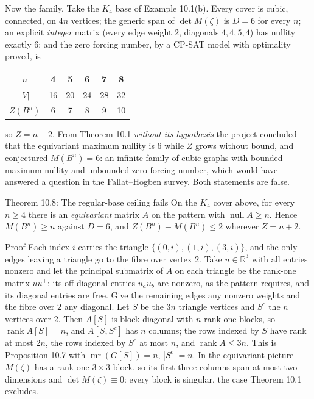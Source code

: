 \documentclass[11pt]{article}
\begin{document}
Now the family. Take the $K_4$ base of Example 10.1(b). Every cover is cubic, connected, on $4n$ vertices; the generic span of $\det M(\zeta)$ is $D=6$ for every $n$; an explicit \emph{integer} matrix (every edge weight $2$, diagonals $4,4,5,4$) has nullity exactly $6$; and the zero forcing number, by a CP-SAT model with optimality proved, is
\begin{center}
\begin{tabular}{c|ccccc}
$n$ & 4 & 5 & 6 & 7 & 8\\ \hline
$|V|$ & 16 & 20 & 24 & 28 & 32\\
$Z(B^n)$ & 6 & 7 & 8 & 9 & 10
\end{tabular}
\end{center}
so $Z=n+2$. From Theorem 10.1 \emph{without its hypothesis} the project concluded that the equivariant maximum nullity is $6$ while $Z$ grows without bound, and conjectured $M(B^n)=6$: an infinite family of cubic graphs with bounded maximum nullity and unbounded zero forcing number, which would have answered a question in the Fallat--Hogben survey. Both statements are false.

\begin{thmbox}{Theorem 10.8: The regular-base ceiling fails}
On the $K_4$ cover above, for every $n\ge4$ there is an \emph{equivariant} matrix $A$ on the pattern with $\operatorname{null}A\ge n$. Hence $M(B^n)\ge n$ against $D=6$, and $Z(B^n)-M(B^n)\le2$ wherever $Z=n+2$.
\end{thmbox}

\begin{defbox}{Proof}
Each index $i$ carries the triangle $\{(0,i),(1,i),(3,i)\}$, and the only edges leaving a triangle go to the fibre over vertex $2$. Take $u\in\mathbb R^3$ with all entries nonzero and let the principal submatrix of $A$ on each triangle be the rank-one matrix $uu^{\top}$: its off-diagonal entries $u_au_b$ are nonzero, as the pattern requires, and its diagonal entries are free. Give the remaining edges any nonzero weights and the fibre over $2$ any diagonal. Let $S$ be the $3n$ triangle vertices and $S^c$ the $n$ vertices over $2$. Then $A[S]$ is block diagonal with $n$ rank-one blocks, so $\operatorname{rank}A[S]=n$, and $A[S,S^c]$ has $n$ columns; the rows indexed by $S$ have rank at most $2n$, the rows indexed by $S^c$ at most $n$, and $\operatorname{rank}A\le3n$. This is Proposition 10.7 with $\operatorname{mr}(G[S])=n$, $|S^c|=n$. In the equivariant picture $M(\zeta)$ has a rank-one $3\times3$ block, so its first three columns span at most two dimensions and $\det M(\zeta)\equiv0$: every block is singular, the case Theorem 10.1 excludes. \qedhere
\end{defbox}
\end{document}
